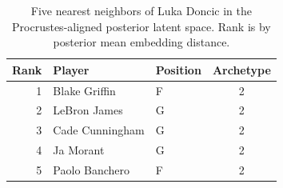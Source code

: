 \begin{table}[htbp]
  \centering\small
  \begin{tabular}{rllc}
    \toprule
    Rank & Player & Position & Archetype \\
    \midrule
    1 & Blake Griffin & F & 2 \\
    2 & LeBron James & G & 2 \\
    3 & Cade Cunningham & G & 2 \\
    4 & Ja Morant & G & 2 \\
    5 & Paolo Banchero & F & 2 \\
    \bottomrule
  \end{tabular}
  \caption{Five nearest neighbors of Luka Doncic in the Procrustes-aligned posterior latent space. Rank is by posterior mean embedding distance.}
  \label{tab:Luka_Doncic_neighbors}
\end{table}

